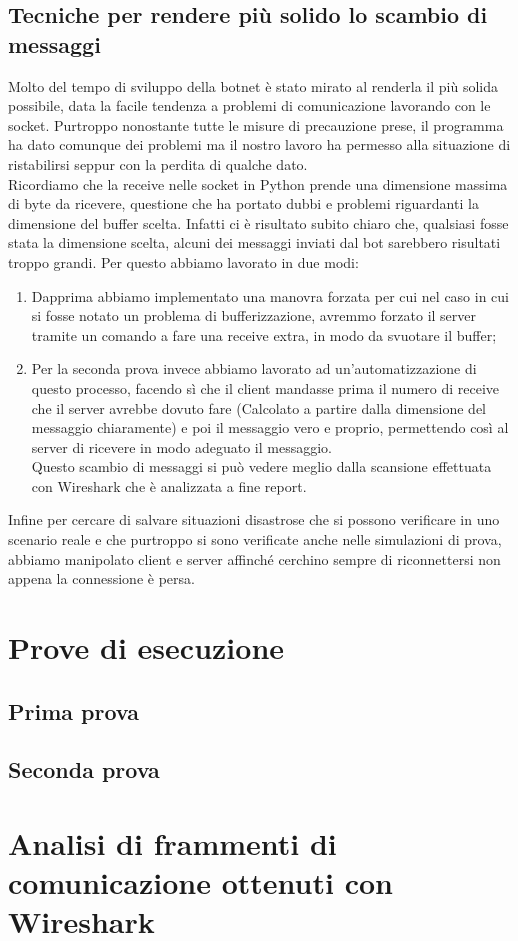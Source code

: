\documentclass[a4paper]{report}
\begin{document}
\section{Tecniche per rendere più solido lo scambio di messaggi}
Molto del tempo di sviluppo della botnet è stato mirato al renderla il più solida possibile, data la facile tendenza a problemi di comunicazione lavorando con le socket.
Purtroppo nonostante tutte le misure di precauzione prese, il programma ha dato comunque dei problemi ma il nostro lavoro ha permesso alla situazione di ristabilirsi seppur con la perdita di qualche dato.\\
Ricordiamo che la receive nelle socket in Python prende una dimensione massima di byte da ricevere, questione che ha portato dubbi e problemi riguardanti la dimensione del buffer scelta. Infatti ci è risultato subito chiaro che, qualsiasi fosse stata la dimensione scelta, alcuni dei messaggi inviati dal bot sarebbero risultati troppo grandi. Per questo abbiamo lavorato in due modi:
\begin{enumerate}
	\item Dapprima abbiamo implementato una manovra forzata per cui nel caso in cui si fosse notato un problema di bufferizzazione, avremmo forzato il server tramite un comando a fare una receive extra, in modo da svuotare il buffer;
	\item Per la seconda prova invece abbiamo lavorato ad un'automatizzazione di questo processo, facendo sì che il client mandasse prima il numero di receive che il server avrebbe dovuto fare (Calcolato a partire dalla dimensione del messaggio chiaramente) e poi il messaggio vero e proprio, permettendo così al server di ricevere in modo adeguato il messaggio.\\
	Questo scambio di messaggi si può vedere meglio dalla scansione effettuata con Wireshark che è analizzata a fine report.
\end{enumerate}
Infine per cercare di salvare situazioni disastrose che si possono verificare in uno scenario reale e che purtroppo si sono verificate anche nelle simulazioni di prova, abbiamo manipolato client e server affinché cerchino sempre di riconnettersi non appena la connessione è persa.

\chapter{Prove di esecuzione}

\section{Prima prova}

\section{Seconda prova}

\chapter{Analisi di frammenti di comunicazione ottenuti con Wireshark}
\end{document}
